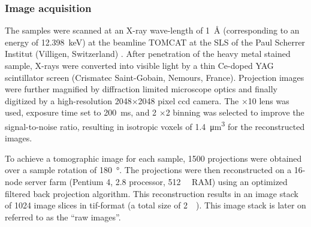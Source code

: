 \subsubsection{Image acquisition}
The samples were scanned at an X-ray wave-length of \SI{1}{\angstrom} (corresponding to an energy of \SI{12.398}{\kilo\electronvolt}) at the beamline \ac{TOMCAT} at the \acf{SLS} of the Paul Scherrer Institut (Villigen, Switzerland) \cite{Stampanoni2002,Stampanoni2007}. After penetration of the heavy metal stained sample, X-rays were converted into visible light by a thin Ce-doped \acs{YAG} scintillator screen (Crismatec Saint-Gobain, Nemours, France). Projection images were further magnified by diffraction limited microscope optics and finally digitized by a high-resolution 2048$\times$2048 pixel \ac{ccd} camera. The $\times$10 lens was used, exposure time set to \SI{200}{\milli\second}, and 2 $\times$2 binning was selected to improve the signal-to-noise ratio, resulting in isotropic voxels of \SI{1.4}{\micro\meter\cubed} for the reconstructed images.

To achieve a tomographic image for each sample, 1500 projections were obtained over a sample rotation of \SI{180}{\degree}. The projections were then reconstructed on a 16-node server farm (Pentium 4, \SI{2.8}{\gigahertz} processor, \SI{512}{\mega\byte} \acs{RAM}) using an optimized filtered back projection algorithm. This reconstruction results in an image stack of 1024 image slices in tif-format (a total size of \SI{2}{\giga\byte}). This image stack is later on referred to as the ``raw images''.

